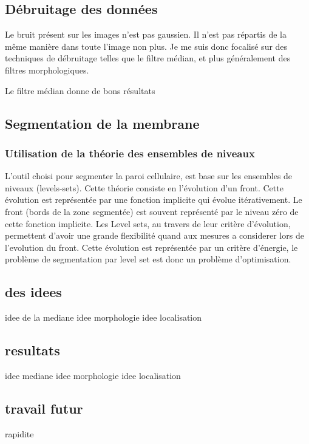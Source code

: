 \subsection{Débruitage des données}
Le bruit présent sur les images n'est pas gaussien. Il n'est pas répartis de la même manière dans toute l'image non plus. Je me suis donc focalisé sur des techniques de débruitage telles que le filtre médian, et plus généralement des filtres morphologiques.

Le filtre médian donne de bons résultats

\subsection{Segmentation de la membrane}

\subsubsection{Utilisation de la théorie des ensembles de niveaux}

L'outil choisi pour segmenter la paroi cellulaire, est base sur les ensembles de niveaux (levels-sets). Cette théorie consiste en l'évolution d'un front. Cette évolution est représentée par une fonction implicite qui évolue itérativement. Le front (bords de la zone segmentée) est souvent représenté par le niveau zéro de cette fonction implicite.
Les Level sets, au travers de leur critère d'évolution, permettent d'avoir une grande flexibilité quand aux mesures a considerer lors de l'evolution du front. Cette évolution est représentée par un critère d'énergie, le problème de segmentation par level set est donc un problème d'optimisation.

\subsection{des idees}






idee de la mediane
idee morphologie
idee localisation
\subsection{resultats}
idee mediane
idee morphologie
idee localisation
\subsection{travail futur}
rapidite



